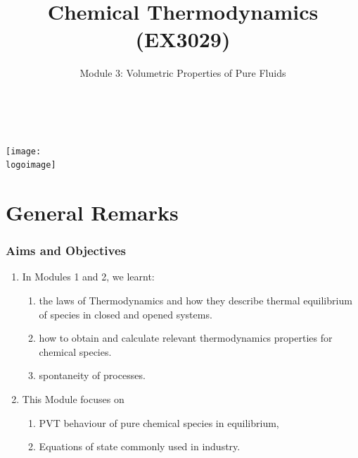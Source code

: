 \documentclass[10pt,compress]{beamer}
\institute{School of Engineering}
\title{Chemical Thermodynamics (EX3029)}
\subtitle{Module 3: Volumetric Properties of Pure Fluids}
\date[ ]{ }
\author[\shortname]{%
  \fullname\\\ttfamily{\emailaddress}
}
\newcommand{\logoimage}{../../FigBanner/UoAHorizBanner}
\begin{document}
\begin{frame}
  \titlepage
  \vfill%
  \begin{center}
    \texttt{[image: \\logoimage]}
  \end{center}
\end{frame}





\section{General Remarks}

\begin{frame}
 \frametitle{Aims and Objectives}
   \begin{enumerate}
     \item<1-> In Modules 1 and 2, we learnt:
       \begin{enumerate}
         \item<1-> the laws of Thermodynamics and how they describe thermal equilibrium of species in closed and opened systems.
         \item<1-> how to obtain and calculate relevant thermodynamics properties for chemical species.
         \item<1-> spontaneity of processes.
       \end{enumerate} 
     \item<2-> This Module focuses on 
         \begin{enumerate}
           \item<2-> PVT behaviour of pure chemical species in equilibrium,
           \item<2-> Equations of state commonly used in industry.
         \end{enumerate}
   \end{enumerate}

\end{frame}


\end{document}
